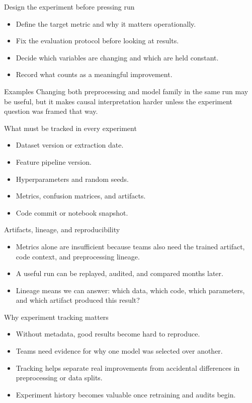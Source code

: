 \begin{frame}{Design the experiment before pressing run}
\begin{itemize}
\item Define the target metric and why it matters operationally.
\item Fix the evaluation protocol before looking at results.
\item Decide which variables are changing and which are held constant.
\item Record what counts as a meaningful improvement.
\end{itemize}
\begin{block}{Examples}
Changing both preprocessing and model family in the same run may be useful, but it makes causal interpretation harder unless the experiment question was framed that way.
\end{block}
\coursefooter
\end{frame}

\begin{frame}{What must be tracked in every experiment}
\begin{itemize}
\item Dataset version or extraction date.
\item Feature pipeline version.
\item Hyperparameters and random seeds.
\item Metrics, confusion matrices, and artifacts.
\item Code commit or notebook snapshot.
\end{itemize}
\coursefooter
\end{frame}

\begin{frame}{Artifacts, lineage, and reproducibility}
\begin{itemize}
\item Metrics alone are insufficient because teams also need the trained artifact, code context, and preprocessing lineage.
\item A useful run can be replayed, audited, and compared months later.
\item Lineage means we can answer: which data, which code, which parameters, and which artifact produced this result?
\end{itemize}
\coursefooter
\end{frame}

\begin{frame}{Why experiment tracking matters}
\begin{itemize}
\item Without metadata, good results become hard to reproduce.
\item Teams need evidence for why one model was selected over another.
\item Tracking helps separate real improvements from accidental differences in preprocessing or data splits.
\item Experiment history becomes valuable once retraining and audits begin.
\end{itemize}
\coursefooter
\end{frame}

